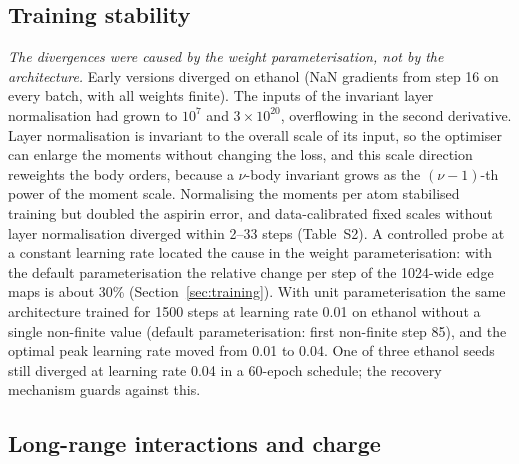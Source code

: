 \documentclass[journal=jctcce,manuscript=article,layout=traditional]{achemso}
\begin{document}
\subsection{Training stability}
\label{sec:stability}
\emph{The divergences were caused by the weight parameterisation, not by the architecture.} Early versions diverged
on ethanol (NaN gradients from step 16 on every batch, with all weights finite). The
inputs of the invariant layer normalisation had grown to $10^{7}$ and $3\times10^{20}$, overflowing in the second
derivative. Layer normalisation is invariant to the overall scale of its input, so the optimiser can enlarge the
moments without changing the loss, and this scale direction reweights the body orders, because a $\nu$-body
invariant grows as the $(\nu-1)$-th power of the moment scale. Normalising the moments per atom stabilised training
but doubled the aspirin error, and data-calibrated fixed scales without layer normalisation diverged within 2--33
steps (Table~S2). A controlled probe at a constant learning rate located the cause in the weight parameterisation:
with the default parameterisation the relative change per step of the 1024-wide edge maps is about 30\%
(Section~\ref{sec:training}). With unit parameterisation the same architecture trained for 1500 steps at learning
rate 0.01 on ethanol without a single non-finite value (default parameterisation: first non-finite step 85), and the
optimal peak learning rate moved from 0.01 to 0.04. One of three ethanol seeds still diverged at learning rate 0.04
in a 60-epoch schedule; the recovery mechanism guards against this.

\subsection{Long-range interactions and charge}
\end{document}
